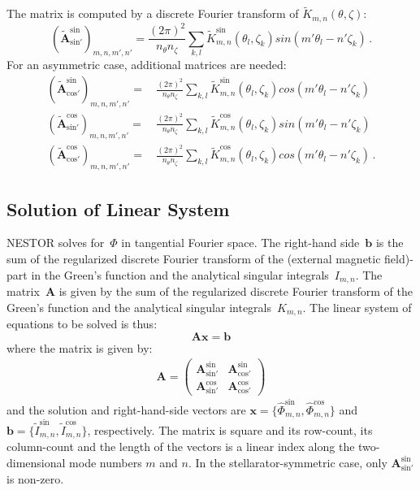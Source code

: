 The matrix is computed by a discrete Fourier transform
of $\tilde{K}_{m,n}(\theta, \zeta)$:
\begin{equation}
 \left( \tilde{\mathbf{A}}^\textrm{sin}_{\textrm{sin}'} \right)_{m, n, m', n'}
 = \frac{(2 \pi)^2}{n_\theta n_\zeta}
   \sum\limits_{k, l}
     \tilde{K}^\textrm{sin}_{m,n}(\theta_l, \zeta_k) sin(m' \theta_l - n' \zeta_k) \, .
\end{equation}
For an asymmetric case, additional matrices are needed:
\begin{align}
 \left( \tilde{\mathbf{A}}^\textrm{sin}_{\textrm{cos}'} \right)_{m, n, m', n'}
 =&\, \frac{(2 \pi)^2}{n_\theta n_\zeta}
      \sum\limits_{k, l}
        \tilde{K}^\textrm{sin}_{m,n}(\theta_l, \zeta_k) cos(m' \theta_l - n' \zeta_k) \\
 \left( \tilde{\mathbf{A}}^\textrm{cos}_{\textrm{sin}'} \right)_{m, n, m', n'}
 =&\, \frac{(2 \pi)^2}{n_\theta n_\zeta}
      \sum\limits_{k, l}
        \tilde{K}^\textrm{cos}_{m,n}(\theta_l, \zeta_k) sin(m' \theta_l - n' \zeta_k) \\
 \left( \tilde{\mathbf{A}}^\textrm{cos}_{\textrm{cos}'} \right)_{m, n, m', n'}
 =&\, \frac{(2 \pi)^2}{n_\theta n_\zeta}
      \sum\limits_{k, l}
        \tilde{K}^\textrm{cos}_{m,n}(\theta_l, \zeta_k) cos(m' \theta_l - n' \zeta_k) \, .
\end{align}

\FloatBarrier
\subsection{Solution of Linear System}
NESTOR solves for~$\Phi$ in tangential Fourier space.
The right-hand side~$\mathbf{b}$ is the sum of
the regularized discrete Fourier transform of the (external magnetic field)-part in the Green's function and
the analytical singular integrals~$I_{m,n}$.
The matrix~$\mathbf{A}$ is given by the sum of
the regularized discrete Fourier transform of the Green's function and
the analytical singular integrals~$K_{m,n}$.
The linear system of equations to be solved is thus:
\begin{equation}
 \mathbf{A} \mathbf{x} = \mathbf{b}
\end{equation}
where the matrix is given by:
\begin{align}
  \mathbf{A}
  = \begin{pmatrix}
      \mathbf{A}^\textrm{sin}_{\textrm{sin}'} & \mathbf{A}^\textrm{sin}_{\textrm{cos}'} \\[2ex]
      \mathbf{A}^\textrm{cos}_{\textrm{sin}'} & \mathbf{A}^\textrm{cos}_{\textrm{cos}'}
    \end{pmatrix}
\end{align}
and the solution and right-hand-side vectors are
$\mathbf{x} = \{ \hat{\Phi}^\textrm{sin}_{m,n}, \hat{\Phi}^\textrm{cos}_{m,n} \}$ and
$\mathbf{b} = \{ \tilde{I}^\textrm{sin}_{m,n}, \tilde{I}^\textrm{cos}_{m,n} \}$, respectively.
The matrix is square and its row-count, its column-count and the length of the vectors
is a linear index along the two-dimensional mode numbers $m$ and $n$.
In the stellarator-symmetric case, only $\mathbf{A}^\textrm{sin}_{\textrm{sin}'}$ is non-zero.

